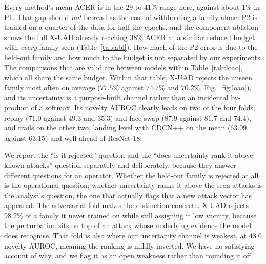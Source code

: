 \documentclass[conference]{IEEEtran}
\begin{document}
\begin{table}[t]
\centering
\caption{Protocol P2, leave-one-attack-out. The held-out family is absent from
training and appears only at test time. Means are over all four folds. Novelty
AUROC ranks the held-out family against the \emph{seen attack} families using the
model's uncertainty score; values below $50$ indicate an inverted ranking, which we
report rather than suppress.}
\label{tab:loao}
\small
\resizebox{\linewidth}{!}{}
\end{table}

Every method's mean ACER is in the $29$ to $41\%$ range here, against about $1\%$
in P1. That gap should \emph{not} be read as the cost of withholding a family
alone: P2 is trained on a quarter of the data for half the epochs, and the
component ablation shows the full X-UAD already reaching $38\%$ ACER at a similar
reduced budget with \emph{every} family seen (Table~\ref{tab:abl}). How much of the
P2 error is due to the held-out family and how much to the budget is not separated
by our experiments. The comparisons that are valid are between models within
Table~\ref{tab:loao}, which all share the same budget. Within that table, X-UAD
rejects the unseen family most often on average ($77.5\%$ against $74.7\%$ and
$70.2\%$, Fig.~\ref{fig:loao}), and its uncertainty is a purpose-built channel
rather than an incidental by-product of a softmax. Its novelty AUROC clearly leads on
two of the four folds, replay ($71.0$ against $49.3$ and $35.3$) and face-swap
($87.9$ against $81.7$ and $74.4$), and trails on the other two, landing level with
CDCN++ on the mean ($63.09$ against $63.15$) and well ahead of ResNet-18.

We report the ``is it rejected'' question and the ``does uncertainty rank it above
known attacks'' question separately and deliberately, because they answer different
questions for an operator. Whether the held-out family is rejected at all is the
operational question; whether uncertainty ranks it above the seen attacks is the
analyst's question, the one that actually flags that a new attack vector has
appeared. The adversarial fold makes the distinction concrete. X-UAD rejects
$98.2\%$ of a family it never trained on while still assigning it low vacuity,
because the perturbation sits on top of an attack whose underlying evidence the
model does recognise. That fold is also where our uncertainty channel is weakest, at
$43.0$ novelty AUROC, meaning the ranking is mildly inverted. We have no satisfying
account of why, and we flag it as an open weakness rather than rounding it off.
\end{document}

